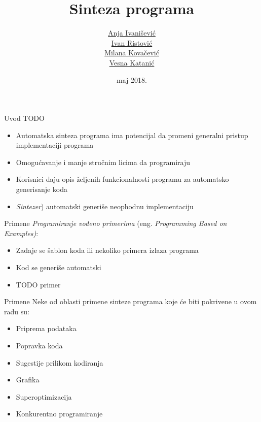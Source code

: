 \documentclass{beamer}
\title{Sinteza programa}
\author{ \href{mailto:anja.ivanisevic95@gmail.com}{Anja Ivanišević}\\ \href{mailto:mi14031@matf.bg.ac.rs}{Ivan Ristović}\\ \href{mailto:mi14042@matf.bg.ac.rs}{Milana Kovačević}\\ \href{mailto:vesna.katanic@gmail.com}{Vesna Katanić}}
\date{maj 2018.}
\begin{document}
\begin{frame}
    \titlepage
\end{frame}

\begin{frame}{Uvod}
    TODO
    \begin{itemize}
        \item Automatska sinteza programa ima potencijal da promeni generalni pristup implementaciji programa
        \item Omogućavanje i manje stručnim licima da programiraju
        \item Korisnici daju opis željenih funkcionalnosti programu za automatsko generisanje koda
        \item \emph{Sintezer}) automatski generiše neophodnu implementaciju
    \end{itemize}
\end{frame}

\begin{frame}{Primene}
    \emph{Programiranje vođeno primerima} (eng. \emph{Programming Based on Examples)}:
    \begin{itemize}
        \item Zadaje se šablon koda ili nekoliko primera izlaza programa
        \item Kod se generiše automatski
        \item TODO primer
    \end{itemize}
\end{frame}

\begin{frame}{Primene}
    Neke od oblasti primene sinteze programa koje će biti pokrivene u ovom radu su:
    \begin{itemize}
        \item Priprema podataka
        \item Popravka koda
        \item Sugestije prilikom kodiranja
        \item Grafika
        \item Superoptimizacija
        \item Konkurentno programiranje
    \end{itemize}
\end{frame}
\end{document}

